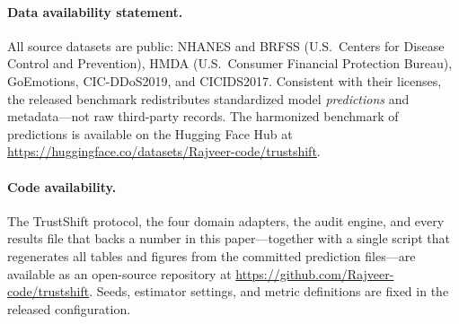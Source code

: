 \documentclass[11pt]{article}
\begin{document}
\paragraph{Data availability statement.} All source datasets are public: NHANES and BRFSS
(U.S.\ Centers for Disease Control and Prevention), HMDA (U.S.\ Consumer Financial Protection
Bureau), GoEmotions, CIC-DDoS2019, and CICIDS2017. Consistent with their licenses, the released
benchmark redistributes standardized model \emph{predictions} and metadata---not raw third-party
records. The harmonized benchmark of predictions is available on the Hugging Face Hub at
\url{https://huggingface.co/datasets/Rajveer-code/trustshift}.

\paragraph{Code availability.} The TrustShift protocol, the four domain adapters, the audit engine,
and every results file that backs a number in this paper---together with a single script that
regenerates all tables and figures from the committed prediction files---are available as an
open-source repository at \url{https://github.com/Rajveer-code/trustshift}. Seeds, estimator
settings, and metric definitions are fixed in the released configuration.


\end{document}
